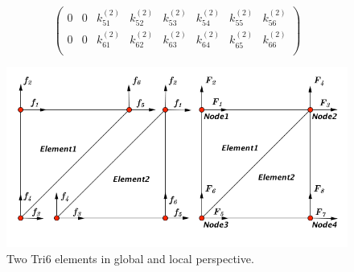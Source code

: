\begin{equation}
\begin{pmatrix}
0 & 0 & k_{51}^{\left(2\right)} & k_{52}^{\left(2\right)} &  k_{53}^{\left(2\right)} &  k_{54}^{\left(2\right)} & k_{55}^{\left(2\right)}  & k_{56}^{\left(2\right)}   \\[0.3em]
0 & 0 & k_{61}^{\left(2\right)} & k_{62}^{\left(2\right)} &  k_{63}^{\left(2\right)} &  k_{64}^{\left(2\right)} & k_{65}^{\left(2\right)}  & k_{66}^{\left(2\right)}    \\[0.3em]
\end{pmatrix}
\end{equation}

\begin{figure}[h]
	\begin{center}
		\includegraphics[width=12cm,clip]{assembly.pdf}			
		\caption{Two Tri6 elements in global and local perspective.} \label{fig: assembly}
	\end{center} 
\end{figure}

